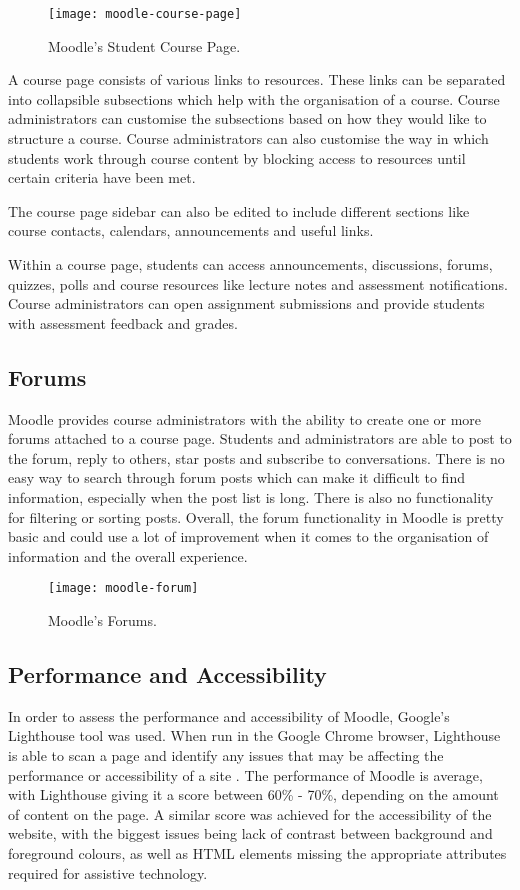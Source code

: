 \begin{figure}[h!]
    \centering
    \texttt{[image: moodle-course-page]}
    \caption{Moodle's Student Course Page.}
\end{figure}

A course page consists of various links to resources. These links can be separated into collapsible subsections which help with the organisation of a course.
Course administrators can customise the subsections based on how they would like to structure a course.
Course administrators can also customise the way in which students work through course content by blocking access to resources until certain criteria have been met.

The course page sidebar can also be edited to include different sections like course contacts, calendars, announcements and useful links.

Within a course page, students can access announcements, discussions, forums, quizzes, polls and course resources like lecture notes and assessment notifications.
Course administrators can open assignment submissions and provide students with assessment feedback and grades.

\subsection{Forums}

Moodle provides course administrators with the ability to create one or more forums attached to a course page.
Students and administrators are able to post to the forum, reply to others, star posts and subscribe to conversations.
There is no easy way to search through forum posts which can make it difficult to find information, especially when the post list is long.
There is also no functionality for filtering or sorting posts.
Overall, the forum functionality in Moodle is pretty basic and could use a lot of improvement when it comes to the organisation of information and the overall experience.

\begin{figure}[h!]
    \centering
    \texttt{[image: moodle-forum]}
    \caption{Moodle's Forums.}
\end{figure}

\subsection{Performance and Accessibility}
In order to assess the performance and accessibility of Moodle, Google's Lighthouse tool was used.
When run in the Google Chrome browser, Lighthouse is able to scan a page and identify any issues that may be affecting the performance or accessibility of a site \cite{googleLighthouse}.
The performance of Moodle is average, with Lighthouse giving it a score between 60\% - 70\%, depending on the amount of content on the page.
A similar score was achieved for the accessibility of the website, with the biggest issues being lack of contrast between background and foreground colours, as well as HTML elements missing the appropriate attributes required for assistive technology.

